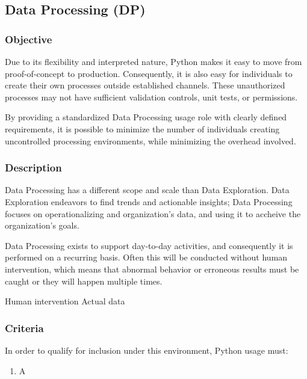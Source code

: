 
	\subsection{Data Processing (DP)}

		\subsubsection{Objective}

			Due to its flexibility and interpreted nature, Python makes it easy to move from proof-of-concept to production. Consequently, it is also easy for individuals to create their own processes outside established channels. These unauthorized processes may not have sufficient validation controls, unit tests, or permissions.

			By providing a standardized Data Processing usage role with clearly defined requirements, it is possible to minimize the number of individuals creating uncontrolled processing environments, while minimizing the overhead involved.

		\subsubsection{Description}

			Data Processing has a different scope and scale than Data Exploration. Data Exploration endeavors to find trends and actionable insights; Data Processing focuses on operationalizing and organization's data, and using it to accheive the organization's goals.

			Data Processing exists to support day-to-day activities, and consequently it is performed on a recurring basis. Often this will be conducted without human intervention, which means that abnormal behavior or erroneous results must be caught or they will happen multiple times.

			Human intervention
			Actual data 

		\subsubsection{Criteria}

			In order to qualify for inclusion under this environment, Python usage must:

			\begin{enumerate}
        		\item A
        	\end{enumerate}

